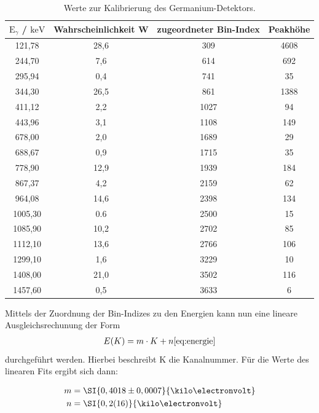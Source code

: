 \begin{table}
    \centering
    \caption{Werte zur Kalibrierung des Germanium-Detektors.}
    \label{tab:Kali}
    \begin{tabular}{ c c c c }
        \toprule
        {$\text{E}_{\gamma}$ / $\si{\kilo \electronvolt}$} & { Wahrscheinlichkeit W} & {zugeordneter Bin-Index} & {Peakhöhe}     \\
        \midrule
        121,78 &    28,6 &  309  & 4608 \\
        244,70 &     7,6 &   614  & 692 \\
        295,94 &    0,4 &   741  & 35 \\
        344,30 &     26,5 &  861  & 1388 \\
        411,12 &    2,2 &   1027 & 94 \\
        443,96 &    3,1 &   1108 & 149 \\
        678,00 &     2,0 &   1689 & 29 \\
        688,67 &    0,9 &   1715 & 35 \\
        778,90 &     12,9 &  1939 & 184 \\
        867,37 &    4,2 &   2159 & 62 \\
        964,08 &    14,6 &  2398 & 134 \\
        1005,30 &    0.6 &   2500 & 15 \\
        1085,90 &    10,2 &  2702 & 85 \\
        1112,10 &    13,6 &  2766 & 106 \\
        1299,10 &    1,6 &   3229 & 10 \\
        1408,00 &    21,0 &  3502 & 116 \\
        1457,60 &    0,5 &   3633 &   6 \\
        \bottomrule
    \end{tabular}
\end{table}
\FloatBarrier

\noindent Mittels der Zuordnung der Bin-Indizes zu den Energien kann nun eine lineare Ausgleichsrechunung der Form
\begin{align*}
    E(K) = m \cdot K + n
    \ref{eq:energie}
\end{align*}
durchgeführt werden. Hierbei beschreibt K die Kanalnummer.
Für die Werte des linearen Fits ergibt sich dann:

\begin{align*}
    m &= \SI{0,4018 \pm 0,0007}{\kilo \electronvolt} \\
    n &= \SI{0,2(16)}{\kilo \electronvolt}
\end{align*}

